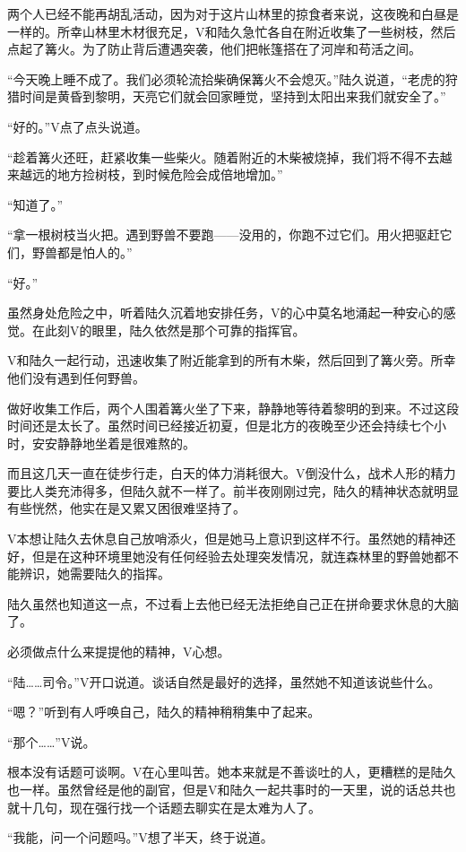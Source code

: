 两个人已经不能再胡乱活动，因为对于这片山林里的掠食者来说，这夜晚和白昼是一样的。所幸山林里木材很充足，V和陆久急忙各自在附近收集了一些树枝，然后点起了篝火。为了防止背后遭遇突袭，他们把帐篷搭在了河岸和苟活之间。

“今天晚上睡不成了。我们必须轮流拾柴确保篝火不会熄灭。”陆久说道，“老虎的狩猎时间是黄昏到黎明，天亮它们就会回家睡觉，坚持到太阳出来我们就安全了。”

“好的。”V点了点头说道。

“趁着篝火还旺，赶紧收集一些柴火。随着附近的木柴被烧掉，我们将不得不去越来越远的地方捡树枝，到时候危险会成倍地增加。”

“知道了。”

“拿一根树枝当火把。遇到野兽不要跑——没用的，你跑不过它们。用火把驱赶它们，野兽都是怕人的。”

“好。”

虽然身处危险之中，听着陆久沉着地安排任务，V的心中莫名地涌起一种安心的感觉。在此刻V的眼里，陆久依然是那个可靠的指挥官。

V和陆久一起行动，迅速收集了附近能拿到的所有木柴，然后回到了篝火旁。所幸他们没有遇到任何野兽。

做好收集工作后，两个人围着篝火坐了下来，静静地等待着黎明的到来。不过这段时间还是太长了。虽然时间已经接近初夏，但是北方的夜晚至少还会持续七个小时，安安静静地坐着是很难熬的。

而且这几天一直在徒步行走，白天的体力消耗很大。V倒没什么，战术人形的精力要比人类充沛得多，但陆久就不一样了。前半夜刚刚过完，陆久的精神状态就明显有些恍然，他实在是又累又困很难坚持了。

V本想让陆久去休息自己放哨添火，但是她马上意识到这样不行。虽然她的精神还好，但是在这种环境里她没有任何经验去处理突发情况，就连森林里的野兽她都不能辨识，她需要陆久的指挥。

陆久虽然也知道这一点，不过看上去他已经无法拒绝自己正在拼命要求休息的大脑了。

必须做点什么来提提他的精神，V心想。

“陆……司令。”V开口说道。谈话自然是最好的选择，虽然她不知道该说些什么。

“嗯？”听到有人呼唤自己，陆久的精神稍稍集中了起来。

“那个……”V说。

根本没有话题可谈啊。V在心里叫苦。她本来就是不善谈吐的人，更糟糕的是陆久也一样。虽然曾经是他的副官，但是V和陆久一起共事时的一天里，说的话总共也就十几句，现在强行找一个话题去聊实在是太难为人了。

“我能，问一个问题吗。”V想了半天，终于说道。

